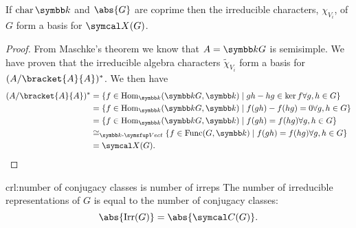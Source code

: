\begin{thm}{}{}
    If \(\Char \field\) and \(\abs{G}\) are coprime then the irreducible characters, \(\chi_{V_i}\), of \(G\) form a basis for \(\classFunctions(G)\).
    \begin{proof}
        From Maschke's theorem we know that \(A = \field G\) is semisimple.
        We have proven that the irreducible algebra characters \(\widetilde{\chi}_{V_i}\) form a basis for \((A/\bracket{A}{A})^*\).
        We then have
        \begin{align}
            (A/\bracket{A}{A})^* &= \{f \in \Hom_{\field}(\field G, \field) \mid gh - hg \in \ker f \forall g, h \in G\} \notag\\
            &= \{f \in \Hom_{\field}(\field G, \field) \mid f(gh) - f(hg) = 0 \forall g, h \in G\} \notag\\
            &= \{f \in \Hom_{\field}(\field G, \field) \mid f(gh) = f(hg) \forall g, h \in G\} \notag\\
            &\isomorphic_{\Vect} \{f \in \Func(G, \field) \mid f(gh) = f(hg) \forall g, h \in G\} \notag\\
            &= \classFunctions(G). \notag
        \end{align}
    \end{proof}
\end{thm}

\begin{crl}{}{crl:number of conjugacy classes is number of irreps}
    The number of irreducible representations of \(G\) is equal to the number of conjugacy classes:
    \begin{equation}
        \abs{\Irr(G)} = \abs{\conjugacyClasses(G)}.
    \end{equation}
\end{crl}

